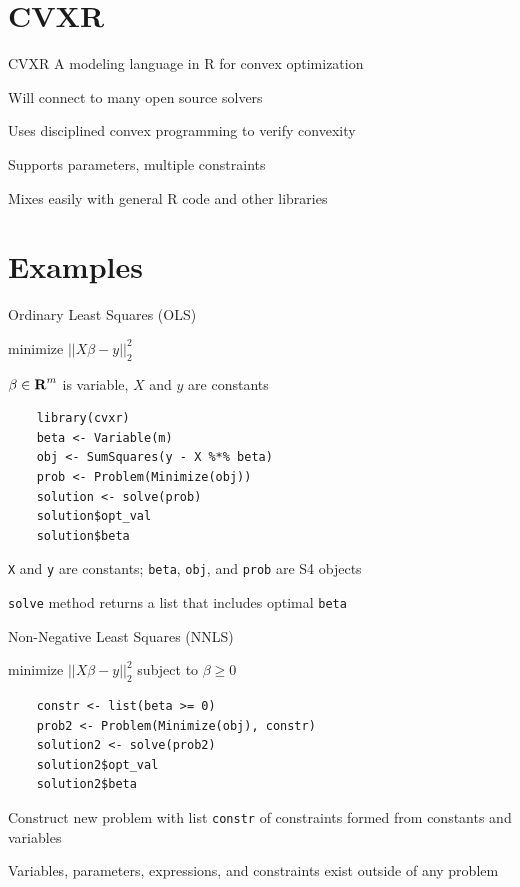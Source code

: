 \documentclass{beamer}
\begin{document}
\section{CVXR}

\begin{frame}{CVXR}
	A modeling language in R for convex optimization
	
	\BIT
		\item Will connect to many open source solvers
		\item Uses disciplined convex programming to 
verify convexity
		\item Supports parameters, multiple constraints
		\item Mixes easily with general R code and other libraries
	\EIT
\end{frame}

\section{Examples}

\begin{frame}[fragile]{Ordinary Least Squares (OLS)}
	\BIT
		\item minimize $||X\beta - y||_2^2$
		\item $\beta \in {\mbox{\bf R}}^m$ is variable, $X$ and $y$ are constants
	\EIT
	
	\pause
	\begin{verbatim}
	library(cvxr)
	beta <- Variable(m)
	obj <- SumSquares(y - X %*% beta)
	prob <- Problem(Minimize(obj))
	solution <- solve(prob)
	solution$opt_val
	solution$beta
	\end{verbatim}
	
	\BIT
		\item \verb|X| and \verb|y| are constants; \verb|beta|, \verb|obj|, and \verb|prob| are S4 objects
		\item \verb|solve| method returns a list that includes optimal \verb|beta|
	\EIT
\end{frame}

\begin{frame}[fragile]{Non-Negative Least Squares (NNLS)}
	\BIT
	\item minimize $||X\beta - y||_2^2$ subject to $\beta \geq 0$
	\EIT
	\pause
	\begin{verbatim}
	constr <- list(beta >= 0)
	prob2 <- Problem(Minimize(obj), constr)
	solution2 <- solve(prob2)
	solution2$opt_val
	solution2$beta
	\end{verbatim}
	
	\BIT
		\item Construct new problem with list \verb|constr| of constraints formed from constants and variables
		\item Variables, parameters, expressions, and constraints exist outside of any problem
	\EIT
\end{frame}
\end{document}
